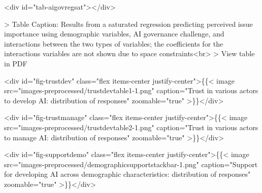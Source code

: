 \documentclass{article}
\begin{document}
\begin{table}<div id="tab-aigovregsat"></div>

> Table Caption: \label{tab:aigovregsat}Results from a saturated regression predicting perceived issue importance using demographic variables, AI governance challenge, and interactions between the two types of variables; the coefficients for the interactions variables are not shown due to space constraints<br>
> View table in PDF
\end{table}

<div id="fig-trustdev" class="flex items-center justify-center">\{\{< image src="images-preprocessed/trustdevtable1-1.png" caption="Trust in various actors to develop AI: distribution of responses" zoomable="true" >\}\}</div>



<div id="fig-trustmanage" class="flex items-center justify-center">\{\{< image src="images-preprocessed/trustdevtable2-1.png" caption="Trust in various actors to manage AI: distribution of responses" zoomable="true" >\}\}</div>



<div id="fig-supportdemo" class="flex items-center justify-center">\{\{< image src="images-preprocessed/demographicsupportstackbar-1.png" caption="Support for developing AI across demographic characteristics: distribution of responses" zoomable="true" >\}\}</div>




\FloatBarrier
\end{document}
